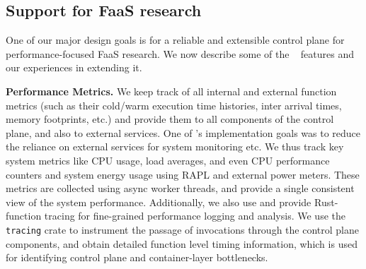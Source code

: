 


\subsection{Support for FaaS research}
\label{sec:impl:support}

One of our major design goals is for a reliable and extensible control plane for performance-focused FaaS research.
We now describe some of the \sysname~ features and our experiences in extending it.


\noindent \textbf{Performance Metrics.}
We keep track of all internal and external function metrics (such as their cold/warm execution time histories, inter arrival times, memory footprints, etc.) and provide them to all components of the control plane, and also to external services.
%
One of \sysname's implementation goals was to reduce the reliance on external services for system monitoring etc.
We thus track key system metrics like CPU usage, load averages, and even CPU performance counters and system energy usage using RAPL and external power meters.
These metrics are collected using async worker threads, and provide a single consistent view of the system performance.
%
Additionally, we also use and provide Rust-function tracing for fine-grained performance logging and analysis.
We use the \texttt{tracing} crate to instrument the passage of invocations through the control plane components, and obtain detailed function level timing information, which is used for identifying control plane and container-layer bottlenecks. 

